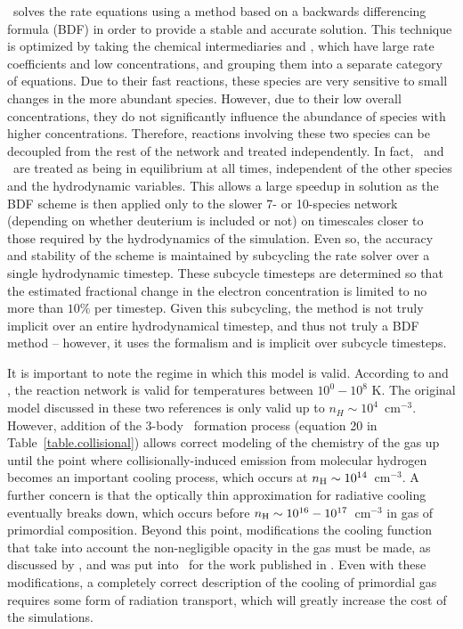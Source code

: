 \enzo\ solves the rate equations using a method based on a backwards
differencing formula (BDF) in order to provide a stable and accurate
solution. This technique is optimized by taking the chemical
intermediaries \Hm and \HHp, which have large rate coefficients and
low concentrations, and grouping them into a separate category of
equations.  Due to their fast reactions, these species are very
sensitive to small changes in the more abundant species.  However, due
to their low overall concentrations, they do not significantly
influence the abundance of species with higher concentrations.
Therefore, reactions involving these two species can be decoupled from
the rest of the network and treated independently.  In fact, \Hm~and
\HHp~are treated as being in equilibrium at all times, independent of
the other species and the hydrodynamic variables.  This allows a large
speedup in solution as the BDF scheme is then applied only to the
slower 7- or 10-species network (depending on whether deuterium is
included or not) on timescales closer to those required by the
hydrodynamics of the simulation.  Even so, the accuracy and stability
of the scheme is maintained by subcycling the rate solver over a
single hydrodynamic timestep.  These subcycle timesteps are determined
so that the estimated fractional change in the electron concentration
is limited to no more than $10\%$ per timestep.  Given this
subcycling, the method is not truly implicit over an entire
hydrodynamical timestep, and thus not truly a BDF method -- however,
it uses the formalism and is implicit over subcycle timesteps.

It is important to note the regime in which this model is valid.
According to \citet{abel97} and \citet{anninos97},
the reaction network is valid for temperatures between $10^0 - 10^8$
K.  The original model discussed in these two references is only valid
up to $n_H \sim 10^4$~cm$^{-3}$.  However, addition of the 3-body
\HH~formation process (equation 20 in Table~\ref{table.collisional})
allows correct modeling of the chemistry of the gas up until the point
where collisionally-induced emission from molecular hydrogen becomes
an important cooling process, which occurs at $n_{\rm H} \sim
10^{14}$~cm$^{-3}$.  A further concern is that the optically thin
approximation for radiative cooling eventually breaks down, which occurs before
$n_{\rm H} \sim 10^{16} - 10^{17}$~cm$^{-3}$ in gas of primordial composition.  Beyond this point,
modifications the cooling function that take into account the
non-negligible opacity in the gas must be made, as discussed by
\citet{2004MNRAS.348.1019R}, and was put into \enzo\ for the work
published in \citep{2009Sci...325..601T,2009PhDT.........5T}.  Even
with these modifications, a completely correct description of the
cooling of primordial gas requires some form of radiation transport,
which will greatly increase the cost of the simulations.

